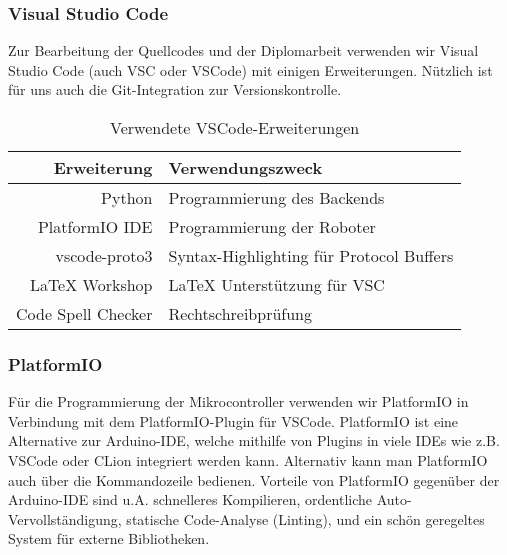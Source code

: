 \subsubsection{Visual Studio Code}
Zur Bearbeitung der Quellcodes und der Diplomarbeit verwenden wir Visual Studio Code (auch VSC oder VSCode) mit einigen Erweiterungen.
%
Nützlich ist für uns auch die Git-Integration zur Versionskontrolle.
\begin{table}[H]
    \centering
    \begin{tabular}{r|l}
        Erweiterung         & Verwendungszweck \\ \hline
        Python              & Programmierung des Backends \\
        PlatformIO IDE      & Programmierung der Roboter \\
        vscode-proto3       & Syntax-Highlighting für Protocol Buffers \\
        LaTeX Workshop      & LaTeX Unterstützung für VSC \\
        Code Spell Checker  & Rechtschreibprüfung \\
    \end{tabular}
    \caption{Verwendete VSCode-Erweiterungen}
    \label{tab:vsc_plugins}
\end{table}
\subsubsection{PlatformIO}
Für die Programmierung der Mikrocontroller verwenden wir PlatformIO \cite{platformio} in Verbindung mit dem PlatformIO-Plugin für VSCode.
%
PlatformIO ist eine Alternative zur Arduino-IDE,
welche mithilfe von Plugins in viele IDEs wie z.B. VSCode oder CLion integriert werden kann.
%
Alternativ kann man PlatformIO auch über die Kommandozeile bedienen.
%
Vorteile von PlatformIO gegenüber der Arduino-IDE sind u.A. schnelleres Kompilieren,
ordentliche Auto-Vervollständigung,
statische Code-Analyse (Linting),
und ein schön geregeltes System für externe Bibliotheken.

